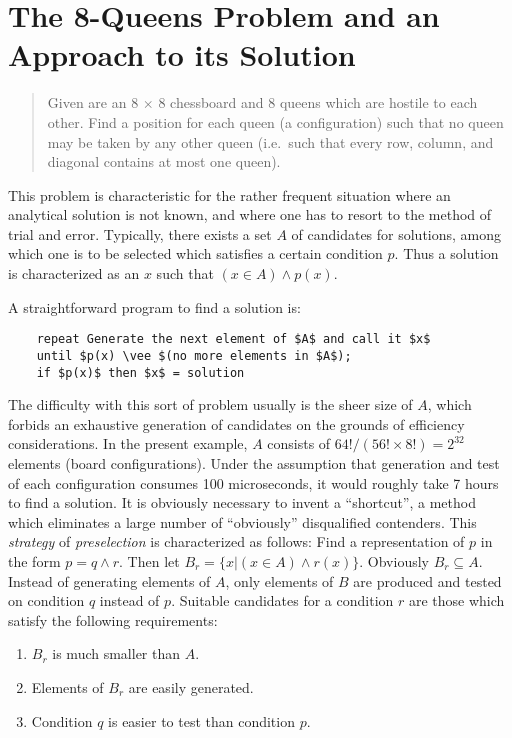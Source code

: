 \section{The 8-Queens Problem and an Approach to its Solution\autocite{dijkstra1968}}

\begin{quote}
Given are an 8 $\times$ 8 chessboard and 8 queens which are hostile to each
other. Find a position for each queen (a configuration) such that no queen may
be taken by any other queen (i.e.\ such that every row, column, and diagonal
contains at most one queen).
\end{quote}

This problem is characteristic for the rather frequent situation where an
analytical solution is not known, and where one has to resort to the method of
trial and error.  Typically, there exists a set $A$ of candidates for
solutions, among which one is to be selected which satisfies a certain
condition $p$. Thus a solution is characterized as an $x$ such that $(x \in A)
\wedge p(x)$.

A straightforward program to find a solution is:

\begin{lstlisting}
    repeat Generate the next element of $A$ and call it $x$
    until $p(x) \vee $(no more elements in $A$);
    if $p(x)$ then $x$ = solution
\end{lstlisting}

The difficulty with this sort of problem usually is the sheer size of $A$,
which forbids an exhaustive generation of candidates on the grounds of
efficiency considerations.  In the present example, $A$ consists of $64!/(56!
\times 8!) = 2^{32}$ elements (board configurations).  Under the assumption
that generation and test of each configuration consumes 100 microseconds, it
would roughly take 7 hours to find a solution. It is obviously necessary to
invent a ``shortcut'', a method which eliminates a large number of
``obviously'' disqualified contenders.  This \emph{strategy} of
\emph{preselection} is characterized as follows: Find a representation of $p$
in the form $p = q \wedge r$.  Then let $B_r = \{x | (x \in A) \wedge r(x)\}$.
Obviously $B_r \subseteq A$.  Instead of generating elements of $A$, only
elements of $B$ are produced and tested on condition $q$ instead of $p$.
Suitable candidates for a condition $r$ are those which satisfy the following
requirements:

\begin{enumerate}
    \item $B_r$ is much smaller than $A$.
    \item Elements of $B_r$ are easily generated.
    \item Condition $q$ is easier to test than condition $p$.
\end{enumerate}

